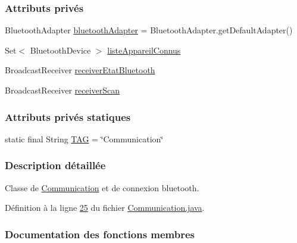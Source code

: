 \subsubsection*{Attributs privés}
\begin{DoxyCompactItemize}
\item 
Bluetooth\+Adapter \hyperlink{classcom_1_1lasalle_1_1io__trucks_1_1_communication_aab37c21038f7b794ab77e6705b8b5938}{bluetooth\+Adapter} = Bluetooth\+Adapter.\+get\+Default\+Adapter()
\item 
Set$<$ Bluetooth\+Device $>$ \hyperlink{classcom_1_1lasalle_1_1io__trucks_1_1_communication_af0441da9cbe4ea858b82214ece930197}{liste\+Appareil\+Connus}
\item 
Broadcast\+Receiver \hyperlink{classcom_1_1lasalle_1_1io__trucks_1_1_communication_a4a45e2d6f9b84afa60b4a28b52f5a4bf}{receiver\+Etat\+Bluetooth}
\item 
Broadcast\+Receiver \hyperlink{classcom_1_1lasalle_1_1io__trucks_1_1_communication_aa226d389c696b51929ee0b62cfd04710}{receiver\+Scan}
\end{DoxyCompactItemize}
\subsubsection*{Attributs privés statiques}
\begin{DoxyCompactItemize}
\item 
static final String \hyperlink{classcom_1_1lasalle_1_1io__trucks_1_1_communication_aec1062036f071d51a4925a3080d71004}{T\+AG} = \char`\"{}Communication\char`\"{}
\end{DoxyCompactItemize}


\subsubsection{Description détaillée}
Classe de \hyperlink{classcom_1_1lasalle_1_1io__trucks_1_1_communication}{Communication} et de connexion bluetooth. 

Définition à la ligne \hyperlink{_communication_8java_source_l00025}{25} du fichier \hyperlink{_communication_8java_source}{Communication.\+java}.



\subsubsection{Documentation des fonctions membres}
\mbox{\label{classcom_1_1lasalle_1_1io__trucks_1_1_communication_aba4889871694f97fb1897f9a5b0979f4}} 
